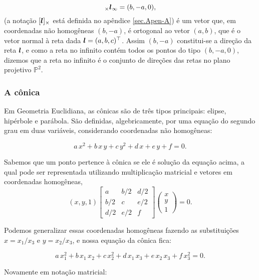 \begin{equation*}
[\lightrgb]_\times \lightrgb_\infty=(b,-a,0),
\end{equation*}
(a notação $[\boldsymbol{l}]_\times$ está definida no apêndice \ref{sec.Apen-A}) é um vetor que, em coordenadas não homogêneas $(b,-a)$, é ortogonal ao vetor $(a,b)$, que é o vetor normal à reta dada $\boldsymbol{l}=(a,b,c)^\top$. Assim $(b,-a)$ constitui-se a direção da reta $\boldsymbol{l}$, e como a reta no infinito contém todos os pontos do tipo $(b,-a,0)$, dizemos que a reta no infinito é o conjunto de direções das retas no plano projetivo $\mathbb{P}^2$.\\

\subsubsection{A cônica}\label{sec.definicao-conica}


Em Geometria Euclidiana, as cônicas são de três tipos principais: elipse, hipérbole e parábola. São definidas, algebricamente, por uma equação do segundo grau em duas variáveis, considerando coordenadas não homogêneas:

\begin{equation*}
a\,x^2+b\,x\,y+c\,y^2+d\,x+e\,y+f=0.
\end{equation*}

Sabemos que um ponto pertence à cônica se ele é solução da equação acima, a qual pode ser representada utilizando multiplicação matricial e vetores em coordenadas homogêneas,
\begin{equation*}
(x,y,1) 
 \begin{bmatrix}
a & b/2 & d/2\\
b/2 & c & e/2\\
d/2 & e/2 & f
\end{bmatrix}
 \begin{pmatrix}
x\\
y\\
1
\end{pmatrix}
 = 0.
\end{equation*}

Podemos generalizar essas coordenadas homogêneas fazendo as substituições $x = x_{1}/x_{3}$ e $y = x_{2}/x_{3}$, e nossa equação da cônica fica:

\begin{equation*}
a\,x_1^2+b\,x_1\,x_2+c\,x_2^2+d\,x_1\,x_3+e\,x_2\,x_3+f\,x_3^2=0.
\end{equation*}

Novamente em notação matricial:

